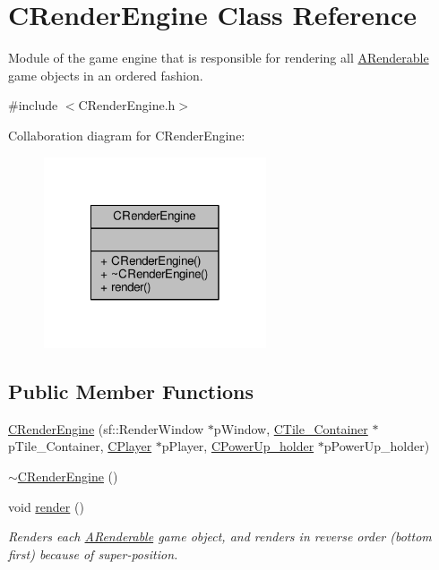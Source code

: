 \hypertarget{classCRenderEngine}{\section{C\-Render\-Engine Class Reference}
\label{classCRenderEngine}
}


Module of the game engine that is responsible for rendering all \hyperlink{classARenderable}{A\-Renderable} game objects in an ordered fashion.  




{\ttfamily \#include $<$C\-Render\-Engine.\-h$>$}



Collaboration diagram for C\-Render\-Engine\-:\nopagebreak
\begin{figure}[H]
\begin{center}
\leavevmode
\includegraphics[width=186pt]{classCRenderEngine__coll__graph}
\end{center}
\end{figure}
\subsection*{Public Member Functions}
\begin{DoxyCompactItemize}
\item 
\hyperlink{classCRenderEngine_acae965ee0ef2ad899562a4b27b33675b}{C\-Render\-Engine} (sf\-::\-Render\-Window $\ast$p\-Window, \hyperlink{classCTile__Container}{C\-Tile\-\_\-\-Container} $\ast$p\-Tile\-\_\-\-Container, \hyperlink{classCPlayer}{C\-Player} $\ast$p\-Player, \hyperlink{classCPowerUp__holder}{C\-Power\-Up\-\_\-holder} $\ast$p\-Power\-Up\-\_\-holder)
\item 
\hyperlink{classCRenderEngine_aa30932df40eda7760a6357308eb7edac}{$\sim$\-C\-Render\-Engine} ()
\item 
void \hyperlink{classCRenderEngine_a38c058de2a8b54f208decdaa7b799ada}{render} ()
\begin{DoxyCompactList}\small\item\em Renders each \hyperlink{classARenderable}{A\-Renderable} game object, and renders in reverse order (bottom first) because of super-\/position. \end{DoxyCompactList}\end{DoxyCompactItemize}



